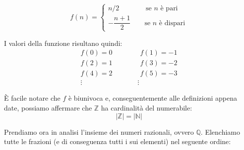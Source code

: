 \begin{equation*}
    f(n) =
    \begin{cases}
    n/2 \qquad \quad \;\;\; \text{se $n$ è pari}\\
    -\dfrac{n+1}{2} \qquad \text{se $n$ è dispari}
    \end{cases}
\end{equation*}

I valori della funzione risultano quindi:
\begin{align*}
    f(0) = 0 \qquad \qquad f(1) = -1\\
    f(2) = 1 \qquad \qquad f(3) = -2\\
    f(4) = 2 \qquad \qquad f(5) = -3\\
    \vdots \qquad \qquad \qquad \qquad \vdots \qquad
\end{align*}

È facile notare che $f$ è biunivoca e, conseguentemente alle definizioni appena date, possiamo affermare che $\mathbb{Z}$ ha cardinalità del numerabile:
\begin{equation*}
    |\mathbb{Z}| = |\mathbb{N}|
\end{equation*}

Prendiamo ora in analisi l'insieme dei numeri razionali, ovvero $\mathbb{Q}$. Elenchiamo tutte le frazioni (e di conseguenza tutti i sui elementi) nel seguente ordine:


